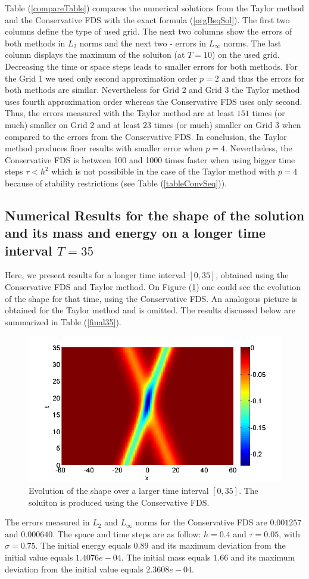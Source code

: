 \documentclass[%
 aip,
cp,  
 amsmath,amssymb,
 reprint,
]{iopconfser}
\newcommand{\rf}[1]{(\ref{#1})}
\begin{document}
Table \rf{compareTable} compares the numerical solutions from the Taylor method and the Conservative FDS with the exact formula \rf{orgBsqSol}. The first two columns define the type of used grid. The next two columns show the errors of both methods in $L_2$ norms and the next two - errors in $L_\infty$ norms. The last column displays the maximum of the soluiton (at $T=10$) on the used grid. Decreasing the time or space steps leads to smaller errors
for both methods. For the Grid 1 we used only second approximation order $p=2$ and thus the errors for both methods are similar. Nevertheless for Grid 2 and Grid 3 the Taylor method uses fourth approximation order whereas 
the Conservative FDS uses only second. Thus, the errors measured with the Taylor method are at least $151$ times (or much) smaller on Grid 2 and at least $23$ times (or much) smaller on Grid 3 when compared to the errors from the Conservative FDS. In conclusion, the Taylor method produces finer results with smaller error when $p=4$. Nevertheless, the Conservative FDS is between 100 and 1000 times faster when using bigger time steps $\tau < h^2$ which is not possibible in the case of the Taylor method with $p=4$ because of stability restrictions (see Table \rf{tableConvSeq}).

\subsection{Numerical Results for the shape of the solution and its mass and energy on a longer time interval $T = 35$}

Here, we present results for a longer time interval $[0, 35]$, obtained using the Conservative FDS and Taylor method. On Figure \rf{sol35} one could see the evolution of the shape for that time, using the Conservative FDS. An analogous picture is obtained for the Taylor method and is omitted. The results discussed below are summarized in Table \rf{final35}. 

\begin{figure}[H]\vspace{0.2cm}
	\centering
	\includegraphics[width=0.7\linewidth]{solution2.png}
\caption{Evolution of the shape over a larger time interval $[0, 35]$. The soluiton is produced using the Conservative FDS.}
\label{sol35}
\end{figure}
The errors measured in $L_2$ and $L_\infty$ norms for the Conservative FDS are $0.001257$ and $0.000640$. The space and time steps are as follow: $h = 0.4$ and  $\tau = 0.05$, with $\sigma = 0.75$. The initial energy equals $0.89$ and its maximum deviation from the initial value equals $1.4076e-04$. The initial mass equals $1.66$ and its maximum deviation from the initial value equals $2.3608e-04$.
\end{document}
